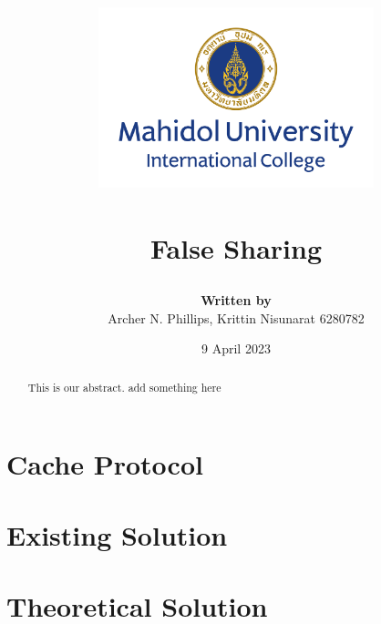 \documentclass[a4paper, 12pt]{report}
\title{

	{\includegraphics[width=80mm,scale=0.5]{MUIC_Logo_Eng_Center.png}} \\
	{\textbf{\mySubject}}\\
	{\large False Sharing}\\
}
\author{
	{\textbf{Written by}} \\ 
	{Archer N. Phillips, Krittin Nisunarat 6280782} \\
}
\date{9 April 2023}
\begin{document}
\maketitle
\begin{abstract}
	This is our abstract. add something here
\end{abstract}
\tableofcontents


\chapter{Cache Protocol}


\chapter{Existing Solution}



\chapter{Theoretical Solution}






\end{document}
